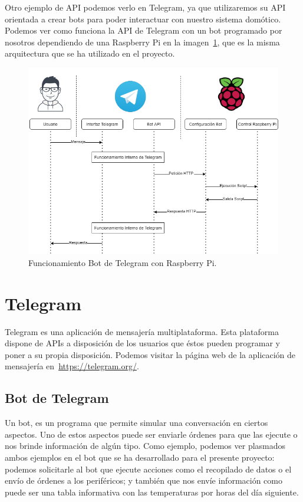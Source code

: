 Otro ejemplo de API podemos verlo en Telegram, ya que utilizaremos su API orientada a crear bots para poder interactuar con nuestro sistema domótico. Podemos ver como funciona la API de Telegram con un bot programado por nosotros dependiendo de una Raspberry Pi en la imagen~\ref{Img:3.FuncionamientoBot}, que es la misma arquitectura que se ha utilizado en el proyecto.

\begin{figure}
    \centering
    \includegraphics[width=1.\textwidth]{img/Diagramas/FuncionamientoBot.png}
    \caption[Funcionamiento Bot]{Funcionamiento Bot de Telegram con Raspberry Pi.} \label{Img:3.FuncionamientoBot}
\end{figure}

\section{Telegram}\label{concepto:Telegram}
Telegram es una aplicación de mensajería multiplataforma. Esta plataforma dispone de APIs a disposición de los usuarios que éstos pueden programar y poner a su propia disposición.
Podemos visitar la página web de la aplicación de mensajería en~\url{https://telegram.org/}.

\subsection{Bot de Telegram}\label{concepto:botTelegram}
Un bot, es un programa que permite simular una conversación en ciertos aspectos. Uno de estos aspectos puede ser enviarle órdenes para que las ejecute o nos brinde información de algún tipo. Como ejemplo, podemos ver plasmados ambos ejemplos en el bot que se ha desarrollado para el presente proyecto: podemos solicitarle al bot que ejecute acciones como el recopilado de datos o el envío de órdenes a los periféricos; y también que nos envíe información como puede ser una tabla informativa con las temperaturas por horas del día siguiente.

